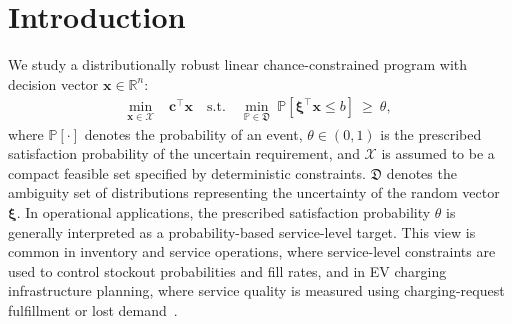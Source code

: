 \documentclass[opre,sglanonrev]{informs4}
\newcommand{\mX}{\mathcal{X}}
\newcommand{\mfD}{\mathfrak{D}}
\newcommand{\mbR}{\mathbb R}
\newcommand{\mbP}{\mathbb{P}}
\newcommand{\bxi}{\bm{\xi}}
\newcommand{\bc}{\bm{c}}
\newcommand{\bx}{\bm{x}}
\begin{document}
\section{Introduction}
We study a distributionally robust linear chance-constrained program
with decision vector $\bx\in\mbR^n$:
\vspace{-0.5em}
\begin{align}\label{prob: DR-CCP}
\min_{\bx \in \mX}\;& \bc^\top \bx
\quad \mathrm{s.t.}\quad
\min_{\mbP\in\mfD}\ \mbP\!\left[\bxi^\top \bx \le b\right]\ \ge\ \theta,
\tag{DR-C}
\end{align}
where $\mbP[\cdot]$ denotes the probability of an event, $\theta\in(0,1)$ is the prescribed satisfaction probability of the uncertain requirement, and $\mX$ is assumed to be a compact feasible set specified by deterministic constraints. $\mfD$ denotes the ambiguity set of distributions representing the uncertainty of the random vector $\bxi$. In operational applications, the prescribed satisfaction probability $\theta$ is generally interpreted as a probability-based service-level target. This view is common in inventory and service operations, where service-level constraints are used to control stockout probabilities and fill rates, and in EV charging infrastructure planning, where service quality is measured using charging-request fulfillment or lost demand~\cite{chen2001inventory,rossi2013service,khaksari2021sizing}.
\end{document}
